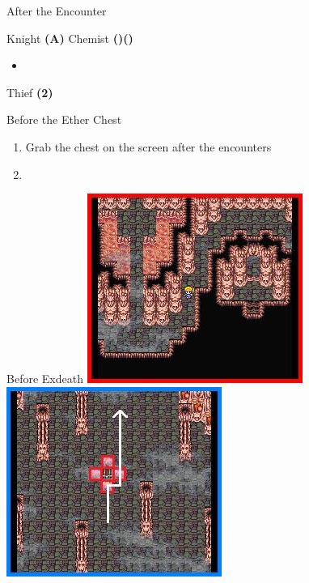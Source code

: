 \begin{paracol}{2}
\switchcolumnTwice[*]
\begin{menu}{After the Encounter}
    \varwb
    \begin{jobMenu}
        \lenna Knight \textbf{(A)}
        \bartz Chemist \textbf{(\pointUp)(\pointRight)} \ability{!\gilToss}
        \begin{itemize}
            \item[] \optimize \space \then {}
        \end{itemize}
        \cara Thief \textbf{(2\pointRight)} \ability{!\escape}
    \end{jobMenu}
    \varwe
\end{menu}

\switchcolumn
\begin{steproute}{Before the Ether Chest}
\end{steproute}

\switchcolumn
\begin{enumerate}[resume]
    \item Grab the  chest on the screen after the encounters
    \item {}
\end{enumerate}

\switchcolumn
\begin{steproute}{Before Exdeath}
    \includegraphics[scale=0.449]{../Graphics/Steps/166. Exdeath's Castle Enc 4.jpeg}
    \includegraphics[scale=0.449]{../Graphics/Steps/167. Exdeath's Castle 6.jpeg}
\end{steproute}


\end{paracol}
